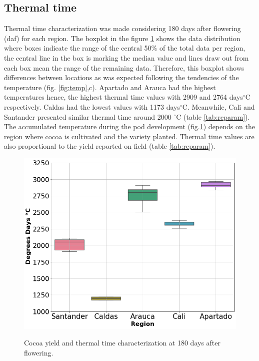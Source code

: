 \documentclass[gene,journal,article,submit,moreauthors,pdftex]{Definitions/mdpi}
\begin{document}
\subsection{Thermal time }
Thermal time characterization  was made considering 180 days after flowering (daf) for each region. The boxplot in the figure \ref{fig:ttbox} shows the data distribution where boxes indicate the range of the central 50\% of the total data per region, the central line in the box is marking the median value and lines draw out from each box mean the range of the remaining data. Therefore, this boxplot shows differences between locations as was expected following the tendencies of the temperature  (fig. \ref{fig:temp},c). Apartado and Arauca had the highest temperatures hence, the highest thermal time values with 2909 and 2764 days$^\circ$C  respectively. Caldas had the lowest values with 1173 days$^\circ$C. Meanwhile, Cali and Santander presented similar thermal time around 2000 $^\circ$C (table \ref{tab:reparam}). The accumulated temperature during the pod development (fig.\ref{fig:ttbox}) depends on the region where cocoa is cultivated and the variety planted. Thermal time values are also proportional to the yield reported on field (table \ref{tab:reparam}).\\

\begin{figure}[h!]
	\centering
	\includegraphics[scale=0.3]{images/ttbbox.png}\\
	\caption{\footnotesize {Cocoa yield and thermal time characterization at 180 days after flowering.\\}}
	\label{fig:ttbox}
\end{figure}
\end{document}
